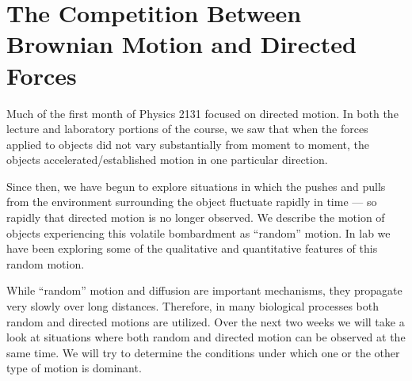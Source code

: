 \chapter{The Competition Between Brownian Motion and Directed Forces}
\thispagestyle{fancy}

Much of the first month of Physics 2131 focused on directed motion.
In both the lecture and laboratory portions of the course, we saw that when the forces applied to objects did not vary substantially from moment to moment, the objects accelerated/established motion in one particular direction.
\par
Since then, we have begun to explore situations in which the pushes and pulls from the environment surrounding the object fluctuate rapidly in time — so rapidly that directed motion is no longer observed. 
We describe the motion of objects experiencing this volatile bombardment as ``random'' motion. 
In lab we have been exploring some of the qualitative and quantitative features of this random motion.
\par
While ``random'' motion and diffusion are important mechanisms, they propagate very slowly over long distances. 
Therefore, in many biological processes both random and directed motions are utilized. 
Over the next two weeks we will take a look at situations where both random and directed motion can be observed at the same time. 
We will try to determine the conditions under which one or the other type of motion is dominant.

